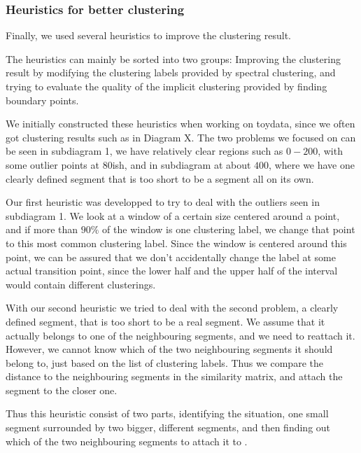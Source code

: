 \subsubsection{Heuristics for better clustering}
Finally, we used several heuristics to improve the clustering result.

The heuristics can mainly be sorted into two groups: Improving the clustering result by modifying the clustering labels provided by spectral clustering, and trying to evaluate the quality of the implicit clustering provided by finding boundary points.

We initially constructed these heuristics when working on toydata, since we often got clustering results such as in Diagram X.  The two problems we focused on can be seen in  subdiagram 1, we have relatively clear regions such as $0-200$, with some outlier points at $80$ish, and in subdiagram at about $400$, where we have one clearly defined segment that is too short to be a segment all on its own. 

Our first heuristic was developped to try to deal with the outliers seen in subdiagram 1. We look at a window of a certain size centered around a point, and if more than $90\%$  of the window is one clustering label, we change that point to this most common clustering label. Since the window is centered around this point, we can be assured that we don't accidentally change the label at some actual transition point, since the lower half and the upper half of the interval would contain different clusterings.


With our second heuristic we tried to deal with the second problem, a clearly defined segment, that is too short to be a real segment. We assume that it actually belongs to one of the neighbouring segments, and we need to reattach it. However, we cannot know which of the two neighbouring segments it should belong to, just based on the list of clustering labels. Thus we compare the distance to the neighbouring segments in the similarity matrix, and attach the segment to the closer one.

Thus this heuristic consist of two parts, identifying the situation, one small segment surrounded by two bigger, different segments, and then finding out which of the two neighbouring segments to attach it to .


